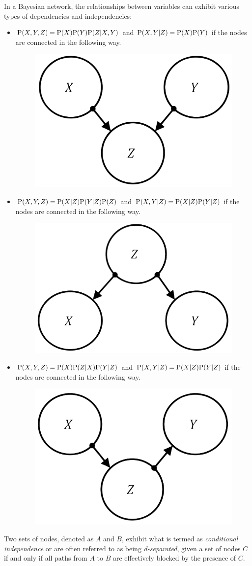 In a Bayesian network, the relationships between variables can exhibit various types of dependencies and independencies: 
\begin{itemize}
    \item $\textnormal{P}(X,Y,Z)=\textnormal{P}(X)\textnormal{P}(Y)\textnormal{P}(Z|X,Y)$ and $\textnormal{P}(X,Y|Z)=\textnormal{P}(X)\textnormal{P}(Y)$ if the nodes are connected in the following way. 
        \begin{figure}[H]
            \centering
            \includegraphics[width=0.2\linewidth]{images/independencies1.png}
        \end{figure}
    \item $\textnormal{P}(X,Y,Z)=\textnormal{P}(X|Z)\textnormal{P}(Y|Z)\textnormal{P}(Z)$ and $\textnormal{P}(X,Y|Z)=\textnormal{P}(X|Z)\textnormal{P}(Y|Z)$ if the nodes are connected in the following way. 
        \begin{figure}[H]
            \centering
            \includegraphics[width=0.2\linewidth]{images/independencies2.png}
        \end{figure}
    \item $\textnormal{P}(X,Y,Z)=\textnormal{P}(X)\textnormal{P}(Z|X)\textnormal{P}(Y|Z)$ and $\textnormal{P}(X,Y|Z)=\textnormal{P}(X|Z)\textnormal{P}(Y|Z)$ if the nodes are connected in the following way. 
        \begin{figure}[H]
            \centering
            \includegraphics[width=0.2\linewidth]{images/independencies3.png}
        \end{figure}
\end{itemize}
\begin{definition}
    Two sets of nodes, denoted as $A$ and $B$, exhibit what is termed as \emph{conditional independence} or are often referred to as being \emph{d-separated}, given a set of nodes $C$ if and only if all paths from $A$ to $B$ are effectively blocked by the presence of $C$.
\end{definition}
